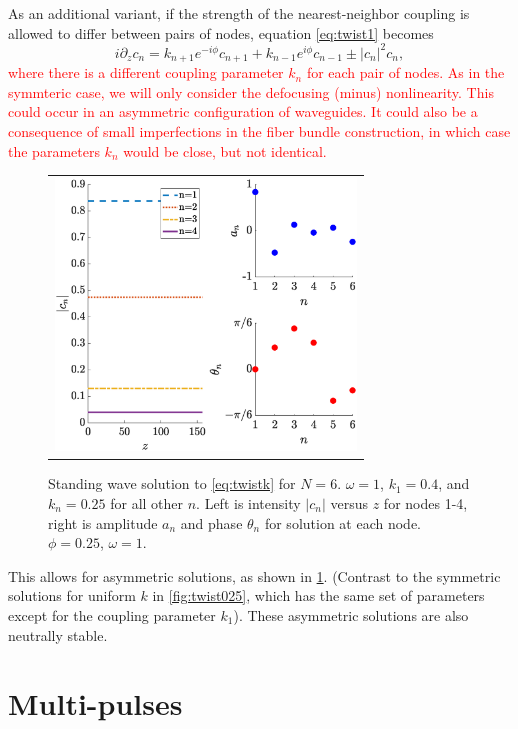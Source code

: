 \documentclass[reprint, amsmath,amssymb,aps,pra]{revtex4-2}
\def\noi{\noindent}
\renewcommand{\revised}[1]{ \textcolor{red}{#1} }
\begin{document}
As an additional variant, if the strength of the nearest-neighbor coupling is allowed to differ between pairs of nodes, equation \cref{eq:twist1} becomes
\begin{equation}\label{eq:twistk}
i \partial_z c_n = k_{n+1} e^{-i\phi}c_{n+1} + k_{n-1} e^{i\phi}c_{n-1} \pm |c_n|^2 c_n,
\end{equation}
\revised{where there is a different coupling parameter $k_n$ for each pair of nodes. As in the symmteric case, we will  only consider the defocusing (minus) nonlinearity. This could occur in an asymmetric configuration of waveguides. It could also be a consequence of small imperfections in the fiber bundle construction, in which case the parameters $k_n$ would be close, but not identical.}
\begin{figure}
\begin{center}
\begin{tabular}{c}
\includegraphics[width=8cm]{even6assym.eps}
\end{tabular}
\end{center}
\caption{Standing wave solution to \cref{eq:twistk} for $N = 6$. $\omega = 1$, $k_1 = 0.4$, and $k_n = 0.25$ for all other $n$. Left is intensity $|c_n|$ versus $z$ for nodes 1-4, right is amplitude $a_n$ and phase $\theta_n$ for solution at each node. $\phi = 0.25$, $\omega = 1$.}
\label{fig:even6assym}
\end{figure}
\noi This allows for asymmetric solutions, as shown in \cref{fig:even6assym}. (Contrast to the symmetric solutions for uniform $k$ in \cref{fig:twist025}, which has the same set of parameters except for the coupling parameter $k_1$). These asymmetric solutions are also neutrally stable.

\section{Multi-pulses}
\end{document}

